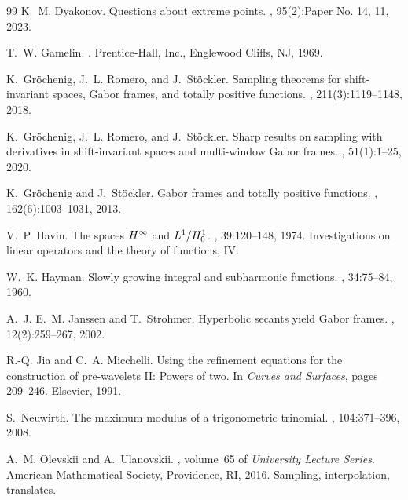 \documentclass[12pt]{amsart}
\numberwithin{equation}{section}
\theoremstyle{plain}
\theoremstyle{definition}
\begin{document}
\begin{thebibliography}{99}
K.~M. Dyakonov.
\newblock Questions about extreme points.
, 95(2):Paper No. 14, 11, 2023.

T.~W. Gamelin.
.
\newblock Prentice-Hall, Inc., Englewood Cliffs, NJ, 1969.

K.~Gr\"{o}chenig, J.~L. Romero, and J.~St\"{o}ckler.
\newblock Sampling theorems for shift-invariant spaces, {G}abor frames, and totally positive functions.
, 211(3):1119--1148, 2018.

K.~Gr\"{o}chenig, J.~L. Romero, and J.~St\"{o}ckler.
\newblock Sharp results on sampling with derivatives in shift-invariant spaces and multi-window {G}abor frames.
, 51(1):1--25, 2020.

K.~Gr\"{o}chenig and J.~St\"{o}ckler.
\newblock Gabor frames and totally positive functions.
, 162(6):1003--1031, 2013.

V.~P. Havin.
\newblock The spaces {$H\sp{\infty }$} and {$L\sp{1}/H\sp{1}\sb{0}$}.
, 39:120--148, 1974.
\newblock Investigations on linear operators and the theory of functions, IV.

W.~K. Hayman.
\newblock Slowly growing integral and subharmonic functions.
, 34:75--84, 1960.

A.~J. E.~M. Janssen and T.~Strohmer.
\newblock Hyperbolic secants yield {G}abor frames.
, 12(2):259--267, 2002.

R.-Q. Jia and C.~A. Micchelli.
\newblock Using the refinement equations for the construction of pre-wavelets {II}: Powers of two.
\newblock In {\em Curves and Surfaces}, pages 209--246. Elsevier, 1991.

S.~Neuwirth.
\newblock The maximum modulus of a trigonometric trinomial.
, 104:371--396, 2008.

A.~M. Olevskii and A.~Ulanovskii.
, volume~65 of {\em University Lecture Series}.
\newblock American Mathematical Society, Providence, RI, 2016.
\newblock Sampling, interpolation, translates.


\end{thebibliography}
\end{document}
